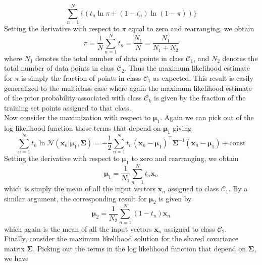 \documentclass[twoside]{article}
\begin{document}
\begin{equation*}
    \sum\limits_{n = 1}^{N}\{(t_n\ln{\pi} + (1 - t_n)\ln{(1 - \pi)})\}
\end{equation*}
Setting the derivative with respect to $\pi$ equal to zero and rearranging, we obtain
\begin{equation*}
    \pi = \frac{1}{N}\sum\limits_{n = 1}^{N}t_n = \frac{N_1}{N}=\frac{N_1}{N_1 + N_2}
\end{equation*}
where $N_1$ denotes the total number of data points in class $\mathcal{C}_1$, and $N_2$ denotes the total number of data points in class $\mathcal{C}_2$. Thus the maximum likelihood estimate for $\pi$ is simply the fraction of points in class $\mathcal{C}_1$ as expected. This result is easily generalized to the multiclass case where again the maximum likelihood estimate of the prior probability associated with class $\mathcal{C}_k$ is given by the fraction of the training set points assigned to that class.\\
Now consider the maximization with respect to $\boldsymbol{\mu}_1$. Again we can pick out of the log likelihood function those terms that depend on $\boldsymbol{\mu}_1$ giving
\begin{equation*}
    \sum\limits_{n = 1}^{N}t_n\ln{\mathcal{N}(\boldsymbol{x}_n|\boldsymbol{\mu}_1, \boldsymbol{\Sigma})} = -\frac{1}{2}\sum\limits_{n = 1}^{N}t_n(\boldsymbol{x}_n - \boldsymbol{\mu}_1)^\intercal\boldsymbol{\Sigma}^{-1}(\boldsymbol{x}_n - \boldsymbol{\mu}_1) + \text{const}
\end{equation*}
Setting the derivative with respect to $\boldsymbol{\mu}_1$ to zero and rearranging, we obtain
\begin{equation*}
    \boldsymbol{\mu}_1 = \frac{1}{N_1}\sum\limits_{n = 1}^{N}t_n\boldsymbol{x}_n
\end{equation*}
which is simply the mean of all the input vectors $\boldsymbol{x}_n$ assigned to class $\mathcal{C}_1$. By a similar argument, the corresponding result for $\boldsymbol{\mu}_2$ is given by
\begin{equation*}
    \boldsymbol{\mu}_2 = \frac{1}{N_2}\sum\limits_{n = 1}^{N}(1 - t_n)\boldsymbol{x}_n
\end{equation*}
which again is the mean of all the input vectors $\boldsymbol{x}_n$ assigned to class $\mathcal{C}_2$.\\
Finally, consider the maximum likelihood solution for the shared covariance matrix $\boldsymbol{\Sigma}$. Picking out the terms in the log likelihood function that depend on $\boldsymbol{\Sigma}$, we have
\end{document}
